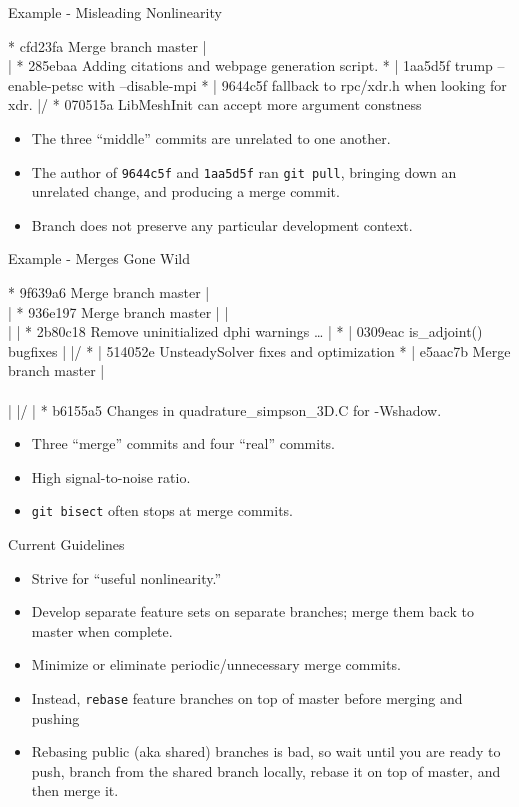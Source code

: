 \documentclass[mathserif]{beamer}
\begin{document}
\begin{frame}[fragile]{Example - Misleading Nonlinearity}
\small
\begin{semiverbatim}
*   cfd23fa Merge branch master
|\\  
| * 285ebaa Adding citations and webpage generation script.
* | 1aa5d5f trump --enable-petsc with --disable-mpi
* | 9644c5f fallback to rpc/xdr.h when looking for xdr.
|/  
* 070515a LibMeshInit can accept more argument constness
\end{semiverbatim}
\begin{itemize}
\item The three ``middle'' commits are unrelated to one another.
\item The author of \texttt{9644c5f} and \texttt{1aa5d5f} ran \texttt{git pull}, bringing
  down an unrelated change, and producing a merge commit.
\item Branch does not preserve any particular development context.
\end{itemize}
\end{frame}


\begin{frame}[fragile]{Example - Merges Gone Wild}
\small
\begin{semiverbatim}
*   9f639a6 Merge branch master
|\\  
| *   936e197 Merge branch master
| |\\  
| | * 2b80c18 Remove uninitialized dphi warnings \ldots
| * | 0309eac is_adjoint() bugfixes
| |/  
* | 514052e UnsteadySolver fixes and optimization
* |   e5aac7b Merge branch master
|\\ \\  
| |/  
| * b6155a5 Changes in quadrature_simpson_3D.C for -Wshadow.
\end{semiverbatim}
  \begin{itemize}
  \item Three ``merge'' commits and four ``real'' commits.
  \item High signal-to-noise ratio.
  \item \texttt{git bisect} often stops at merge commits.
  \end{itemize}
\end{frame}


\begin{frame}{Current Guidelines}
  \begin{itemize}\itemsep=.05\textheight
  \item Strive for ``useful nonlinearity.''
  \item Develop separate feature sets on separate branches; merge them back to master when complete.
  \item Minimize or eliminate periodic/unnecessary merge commits.
  \item Instead, \texttt{rebase} feature branches on top of master before merging and pushing
  \item Rebasing public (aka shared) branches is bad\texttrademark, so wait until you are ready to push,
    branch from the shared branch locally, rebase it on top of master, and then merge it.
  \end{itemize}
\end{frame}
\end{document}
